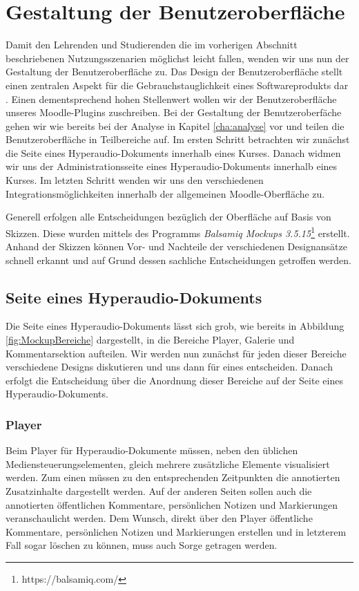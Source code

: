 \section{Gestaltung der Benutzeroberfläche}
Damit den Lehrenden und Studierenden die im vorherigen Abschnitt beschriebenen Nutzungsszenarien möglichst leicht fallen, wenden wir uns nun der Gestaltung der Benutzeroberfläche zu. \glqq Das Design der Benutzeroberfläche stellt einen zentralen Aspekt für die Gebrauchstauglichkeit eines Softwareprodukts dar\grqq{} \citep[S. 1]{oppermann2002user}. Einen dementsprechend hohen Stellenwert wollen wir der Benutzeroberfläche unseres Moodle-Plugins zuschreiben. Bei der Gestaltung der Benutzeroberfäche gehen wir wie bereits bei der Analyse in Kapitel \ref{cha:analyse} vor und teilen die Benutzeroberfläche in Teilbereiche auf. Im ersten Schritt betrachten wir zunächst die Seite eines Hyperaudio-Dokuments innerhalb eines Kurses. Danach widmen wir uns der Administrationsseite eines Hyperaudio-Dokuments innerhalb eines Kurses. Im letzten Schritt wenden wir uns den verschiedenen Integrationsmöglichkeiten innerhalb der allgemeinen Moodle-Oberfläche zu.

Generell erfolgen alle Entscheidungen bezüglich der Oberfläche auf Basis von Skizzen. Diese wurden mittels des Programms \textit{Balsamiq Mockups 3.5.15}\footnote{https://balsamiq.com/} erstellt. Anhand der Skizzen können Vor- und Nachteile der verschiedenen Designansätze schnell erkannt und auf Grund dessen sachliche Entscheidungen getroffen werden. 


\subsection{Seite eines Hyperaudio-Dokuments}
Die Seite eines Hyperaudio-Dokuments lässt sich grob, wie bereits in Abbildung \ref{fig:MockupBereiche} dargestellt, in die Bereiche Player, Galerie und Kommentarsektion aufteilen. Wir werden nun zunächst für jeden dieser Bereiche verschiedene Designs diskutieren und uns dann für eines entscheiden. Danach erfolgt die Entscheidung über die Anordnung dieser Bereiche auf der Seite eines Hyperaudio-Dokuments.


\subsubsection{Player}
Beim Player für Hyperaudio-Dokumente müssen, neben den üblichen Mediensteuerungselementen, gleich mehrere zusätzliche Elemente visualisiert werden. Zum einen müssen zu den entsprechenden Zeitpunkten die annotierten Zusatzinhalte dargestellt werden. Auf der anderen Seiten sollen auch die annotierten öffentlichen Kommentare, persönlichen Notizen und Markierungen veranschaulicht werden. Dem Wunsch, direkt über den Player öffentliche Kommentare, persönlichen Notizen und Markierungen erstellen und in letzterem Fall sogar löschen zu können, muss auch Sorge getragen werden.

